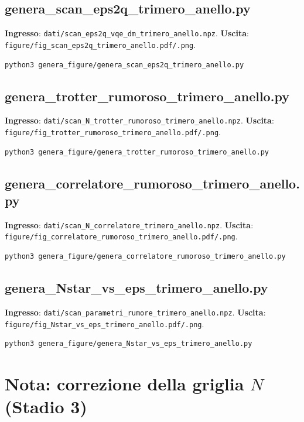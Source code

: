 \documentclass[11pt,a4paper]{article}
\begin{document}
\subsection{genera\_scan\_eps2q\_trimero\_anello.py}
\textbf{Ingresso}: \texttt{dati/scan\_eps2q\_\allowbreak vqe\_dm\_trimero\_anello.npz}.
\textbf{Uscita}: \texttt{figure/fig\_scan\_eps2q\_\allowbreak trimero\_anello.pdf/.png}.
\begin{verbatim}
python3 genera_figure/genera_scan_eps2q_trimero_anello.py
\end{verbatim}

\subsection{genera\_trotter\_rumoroso\_trimero\_anello.py}
\textbf{Ingresso}:
\texttt{dati/scan\_N\_trotter\_\allowbreak rumoroso\_trimero\_anello.npz}.
\textbf{Uscita}:
\texttt{figure/fig\_trotter\_\allowbreak rumoroso\_trimero\_anello.pdf/.png}.
\begin{verbatim}
python3 genera_figure/genera_trotter_rumoroso_trimero_anello.py
\end{verbatim}

\subsection{genera\_correlatore\_rumoroso\_trimero\_anello.py}
\textbf{Ingresso}: \texttt{dati/scan\_N\_\allowbreak correlatore\_trimero\_anello.npz}.
\textbf{Uscita}:
\texttt{figure/fig\_correlatore\_\allowbreak rumoroso\_trimero\_anello.pdf/.png}.
\begin{verbatim}
python3 genera_figure/genera_correlatore_rumoroso_trimero_anello.py
\end{verbatim}

\subsection{genera\_Nstar\_vs\_eps\_trimero\_anello.py}
\textbf{Ingresso}: \texttt{dati/scan\_parametri\_\allowbreak rumore\_trimero\_anello.npz}.
\textbf{Uscita}: \texttt{figure/fig\_Nstar\_vs\_eps\_\allowbreak trimero\_anello.pdf/.png}.
\begin{verbatim}
python3 genera_figure/genera_Nstar_vs_eps_trimero_anello.py
\end{verbatim}

\section{Nota: correzione della griglia \texorpdfstring{$N$}{N} (Stadio 3)}
\end{document}

